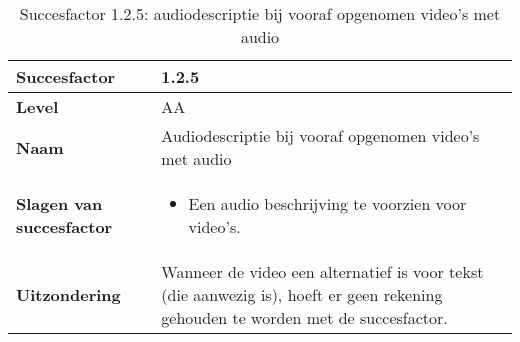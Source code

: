 \begin{table}[H]
    \centering
    \caption{Succesfactor 1.2.5: audiodescriptie bij vooraf opgenomen video’s met audio}
    \hspace*{-1cm}\begin{tabular}{|l|p{12cm}|} 
        \hline
        \textbf{Succesfactor}                & 1.2.5                                                                                                                                                                                                                                                                                                             \\ 
        \hline
        \textbf{Level}                       & AA                                                                                                                                                                                                                                                                                                                                                                             \\ 
        \hline
        \textbf{Naam}                        & Audiodescriptie bij vooraf opgenomen video’s met audio~                                                                                                                                                                                                                                                                                                                                                            \\ 
        \hline
        \textbf{Slagen van succesfactor}     & \begin{itemize}
            \item Een audio beschrijving te voorzien voor video’s.
        \end{itemize}                                                                                                                                                                                                                         \\ 
    \hline
\textbf{Uitzondering}     &
 Wanneer de video een alternatief is voor tekst (die aanwezig is), hoeft er geen rekening gehouden te worden met de succesfactor.                                                                                                                                                                                                                                                                                  \\ 

\end{tabular}
\end{table}
